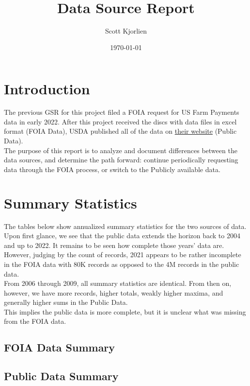 \documentclass{article}
\title{Data Source Report}
\author{Scott Kjorlien}
\date{\today}
\begin{document}
\maketitle

\section*{Introduction} 
The previous GSR for this project filed a FOIA request for US Farm Payments data in early 2022. After this project received 
the discs with data files in excel format (FOIA Data), USDA published all of the data on 
\href{https://www.fsa.usda.gov/news-room/efoia/electronic-reading-room/frequently-requested-information/payment-files-information/index}{their website} 
(Public Data).\\

The purpose of this report is to analyze and document differences between the data sources, and determine the path forward: 
continue periodically requesting data through the FOIA process, or switch to the Publicly available data.

\section*{Summary Statistics}
The tables below show annualized summary statistics for the two sources of data. Upon first glance, we see that the public 
data extends the horizon back to 2004 and up to 2022. It remains to be seen how complete those years' data are. However, 
judging by the count of records, 2021 appears to be rather incomplete in the FOIA data with 80K records as opposed to the 4M records 
in the public data. \\

From 2006 through 2009, all summary statistics are identical. From then on, however, we have more records, higher totals, 
weakly higher maxima, and generally higher sums in the Public Data. \\ 
This implies the public data is more complete, but it is unclear what was missing from the FOIA data. 


\subsection*{FOIA Data Summary}


\subsection*{Public Data Summary}

\end{document}
